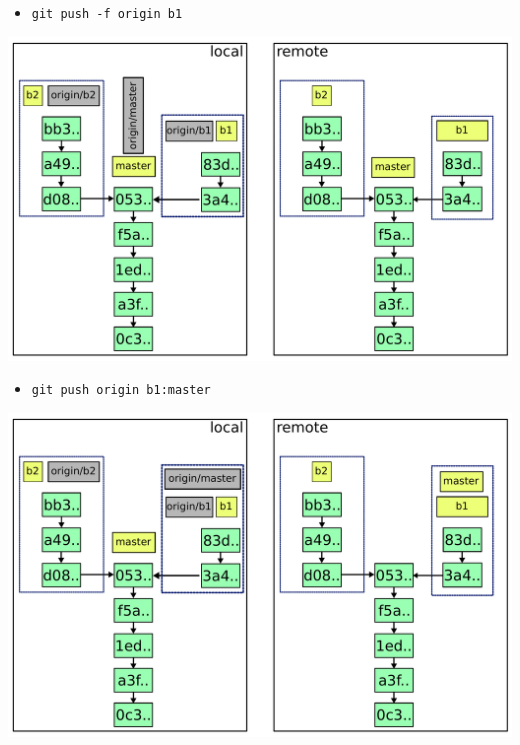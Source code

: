 \documentclass{beamer}
\begin{document}
\begin{frame}{}
  \begin{itemize}
  \item \lstinline|git push -f origin b1|
  \end{itemize}
\end{frame}

\begin{frame}{}
  \includegraphics[width=\textwidth]{img/6.pdf}
\end{frame}

\begin{frame}{}
  \begin{itemize}
  \item \lstinline|git push origin b1:master|
  \end{itemize}
\end{frame}

\begin{frame}{}
  \includegraphics[width=\textwidth]{img/7.pdf}
\end{frame}
\end{document}
